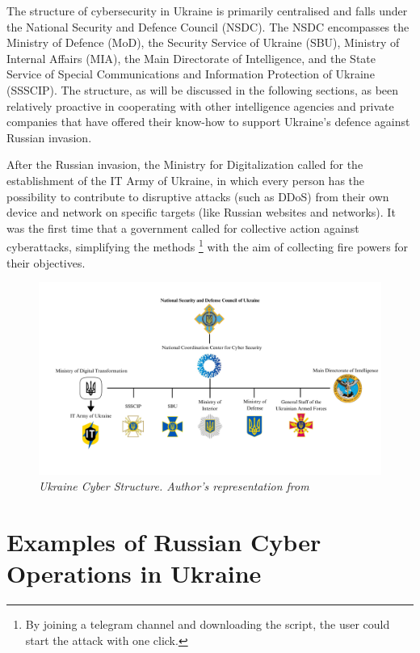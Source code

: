 The structure of cybersecurity in Ukraine is primarily centralised and falls under the National Security and Defence Council (NSDC). The NSDC encompasses the Ministry of Defence (MoD), the Security Service of Ukraine (SBU), Ministry of Internal Affairs (MIA), the Main Directorate of Intelligence, and the State Service of Special Communications and Information Protection of Ukraine (SSSCIP). The structure, as will be discussed in the following sections, as been relatively proactive in cooperating with other intelligence agencies and private companies that have offered their know-how to support Ukraine's defence against Russian invasion. 

After the Russian invasion, the Ministry for Digitalization called for the establishment of the IT Army of Ukraine, in which every person has the possibility to contribute to disruptive attacks (such as DDoS) from their own device and network on specific targets (like Russian websites and networks). It was the first time that a government called for collective action against cyberattacks, simplifying the methods \footnote{By joining a telegram channel and downloading the script, the user could start the attack with one click.} with the aim of collecting fire powers for their objectives. 

\begin{figure}[H]
\centering
\includegraphics[width=1\textwidth]{Images/UkraineCyber.png}
\caption{\textit{Ukraine Cyber Structure. Author's representation from \textcite{brantly_2019_cybersecurity}}}
\label{UkraineCyber.png}
\end{figure}

\section{Examples of Russian Cyber Operations in Ukraine}

